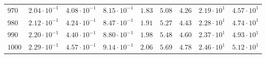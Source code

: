 \begin{landscape}
\begin{table}
\begin{tabular}{lcccccccc}
$	970	$ & $	2.04 \cdot 10^{-1} 	$ & $	4.08 \cdot 10^{-1} 	$ & $	8.15 \cdot 10^{-1} 	$ & $	1.83 	$ & $	5.08 	$ & $	4.26 	$ & $	2.19 \cdot 10^{1} 	$ & $	4.57 \cdot 10^{1} 	 $ \\
$	980	$ & $	2.12 \cdot 10^{-1} 	$ & $	4.24 \cdot 10^{-1} 	$ & $	8.47 \cdot 10^{-1} 	$ & $	1.91 	$ & $	5.27 	$ & $	4.43 	$ & $	2.28 \cdot 10^{1} 	$ & $	4.74 \cdot 10^{1} 	 $ \\
$	990	$ & $	2.20 \cdot 10^{-1} 	$ & $	4.40 \cdot 10^{-1} 	$ & $	8.80 \cdot 10^{-1} 	$ & $	1.98 	$ & $	5.48 	$ & $	4.60 	$ & $	2.37 \cdot 10^{1} 	$ & $	4.93 \cdot 10^{1} 	 $ \\
$	1000	$ & $	2.29 \cdot 10^{-1} 	$ & $	4.57 \cdot 10^{-1} 	$ & $	9.14 \cdot 10^{-1} 	$ & $	2.06 	$ & $	5.69 	$ & $	4.78 	$ & $	2.46 \cdot 10^{1} 	$ & $	5.12 \cdot 10^{1} 	 $ \\
        \hline
      \end{tabular}
  \end{table}
\end{landscape}

